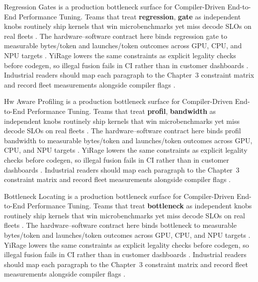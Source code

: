 Regression Gates is a production bottleneck surface for Compiler-Driven End-to-End Performance Tuning. Teams that treat \textbf{regression}, \textbf{gate} as independent knobs routinely ship kernels that win microbenchmarks yet miss decode SLOs on real fleets \citep{liu2024deepseekv3,memoryfloor2026}. The hardware--software contract here binds regression gate to measurable bytes/token and launches/token outcomes across GPU, CPU, and NPU targets \citep{patel2025llminference,nvidia2022hopper}. YiRage lowers the same constraints as explicit legality checks before codegen, so illegal fusion fails in CI rather than in customer dashboards \citep{taxbreak2026,semianalysis2024tma}. Industrial readers should map each paragraph to the Chapter~3 constraint matrix and record fleet measurements alongside compiler flags \citep{memoryfloor2026,amd2024xdna}.

Hw Aware Profiling is a production bottleneck surface for Compiler-Driven End-to-End Performance Tuning. Teams that treat \textbf{profil}, \textbf{bandwidth} as independent knobs routinely ship kernels that win microbenchmarks yet miss decode SLOs on real fleets \citep{patel2025llminference,nvidia2022hopper}. The hardware--software contract here binds profil bandwidth to measurable bytes/token and launches/token outcomes across GPU, CPU, and NPU targets \citep{taxbreak2026,semianalysis2024tma}. YiRage lowers the same constraints as explicit legality checks before codegen, so illegal fusion fails in CI rather than in customer dashboards \citep{memoryfloor2026,amd2024xdna}. Industrial readers should map each paragraph to the Chapter~3 constraint matrix and record fleet measurements alongside compiler flags \citep{nvidia2022hopper,amd2024aie}.

Bottleneck Locating is a production bottleneck surface for Compiler-Driven End-to-End Performance Tuning. Teams that treat \textbf{bottleneck} as independent knobs routinely ship kernels that win microbenchmarks yet miss decode SLOs on real fleets \citep{taxbreak2026,semianalysis2024tma}. The hardware--software contract here binds bottleneck to measurable bytes/token and launches/token outcomes across GPU, CPU, and NPU targets \citep{memoryfloor2026,amd2024xdna}. YiRage lowers the same constraints as explicit legality checks before codegen, so illegal fusion fails in CI rather than in customer dashboards \citep{nvidia2022hopper,amd2024aie}. Industrial readers should map each paragraph to the Chapter~3 constraint matrix and record fleet measurements alongside compiler flags \citep{semianalysis2024tma,dlbook}.

